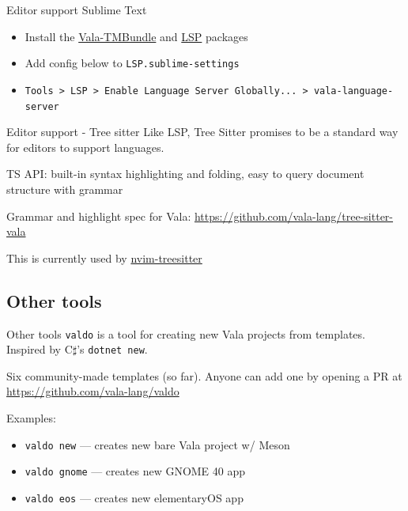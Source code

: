 \documentclass[t]{beamer}
\begin{document}

\begin{frame}[c]{Editor support}
    Sublime Text
    \begin{itemize}
        \item Install the \href{https://packagecontrol.io/packages/Vala-TMBundle}{Vala-TMBundle} and \href{https://github.com/sublimelsp/LSP}{LSP} packages
        \item Add config below to \texttt{LSP.sublime-settings}
        \item \texttt{Tools > LSP > Enable Language Server Globally... > vala-language-server}
    \end{itemize}
    \exampleCode
\end{frame}

\begin{frame}[c]{Editor support - Tree sitter}
Like LSP, Tree Sitter promises to be a standard way for editors to support languages.

TS API: built-in syntax highlighting and folding, easy to query document structure with grammar

{\small Grammar and highlight spec for Vala: \url{https://github.com/vala-lang/tree-sitter-vala}}

This is currently used by \href{https://github.com/nvim-treesitter/nvim-treesitter}{nvim-treesitter}
\end{frame}

\subsection{Other tools}
\begin{frame}[c]{Other tools}
\texttt{valdo} is a tool for creating new Vala projects from templates. Inspired by C$\sharp$'s \texttt{dotnet new}.

Six community-made templates (so far). Anyone can add one by opening a PR at \url{https://github.com/vala-lang/valdo}

Examples:
\begin{itemize}
    \item \texttt{valdo new} --- creates new bare Vala project w/ Meson
    \item \texttt{valdo gnome} --- creates new GNOME 40 app
    \item \texttt{valdo eos} --- creates new elementaryOS app
\end{itemize}

\end{frame}
\end{document}
